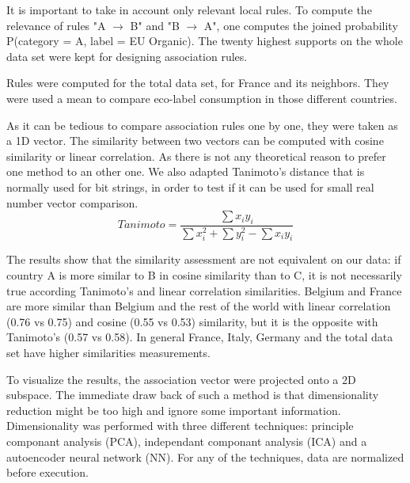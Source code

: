 \documentclass[11pt]{article}
\begin{document}
It is important to take in account only relevant local rules. To compute the relevance of rules "A $\rightarrow$ B" and "B $\rightarrow$ A", one computes the joined probability P(category = A, label = EU Organic). The twenty highest supports on the whole data set were kept for designing association rules.

Rules were computed for the total data set, for France and its neighbors. They were used a mean to compare eco-label consumption in those different countries.

As it can be tedious to compare association rules one by one, they were taken as a 1D vector. The similarity between two vectors can be computed with cosine similarity or linear correlation. As there is not any theoretical reason to prefer one method to an other one. We also adapted Tanimoto's distance that is normally used for bit strings, in order to test if it can be used for small real number vector comparison.
\begin{equation}
    Tanimoto=\frac{\sum{x_i y_i}}{\sum{x_i^2}+\sum{y_i^2}-\sum{x_i y_i}}
\end{equation}

The results show that the similarity assessment are not equivalent on our data: if country A is more similar to B in cosine similarity than to C, it is not necessarily true according Tanimoto's and linear correlation similarities. Belgium and France are more similar than Belgium and the rest of the world with linear correlation (0.76 vs 0.75) and cosine (0.55 vs 0.53) similarity, but it is the opposite with Tanimoto's (0.57 vs 0.58).
In general France, Italy, Germany and the total data set have higher similarities measurements.


To visualize the results, the association vector were projected onto a 2D subspace. The immediate draw back of such a method is that dimensionality reduction might be too high and ignore some important information. Dimensionality was performed with three different techniques: principle componant analysis (PCA), independant componant analysis (ICA) and a autoencoder neural network (NN). For any of the techniques, data are normalized before execution.
\end{document}
